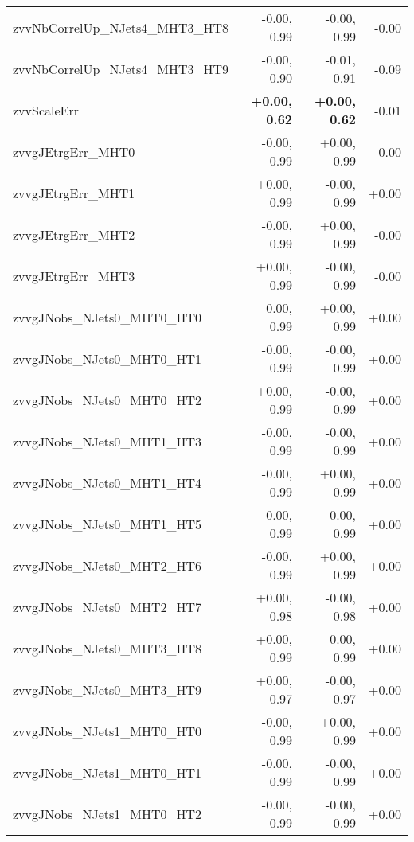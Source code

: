 \begin{tabular}{|l|r|r|r|}
zvvNbCorrelUp\_NJets4\_MHT3\_HT8         &      -0.00, 0.99 &     -0.00, 0.99 &  -0.00 \\
zvvNbCorrelUp\_NJets4\_MHT3\_HT9         &      -0.00, 0.90 &     -0.01, 0.91 &  -0.09 \\
zvvScaleErr                              &  \textbf{ +0.00, 0.62} & \textbf{ +0.00, 0.62} &  -0.01 \\
zvvgJEtrgErr\_MHT0                       &      -0.00, 0.99 &     +0.00, 0.99 &  -0.00 \\
zvvgJEtrgErr\_MHT1                       &      +0.00, 0.99 &     -0.00, 0.99 &  +0.00 \\
zvvgJEtrgErr\_MHT2                       &      -0.00, 0.99 &     +0.00, 0.99 &  -0.00 \\
zvvgJEtrgErr\_MHT3                       &      +0.00, 0.99 &     -0.00, 0.99 &  -0.00 \\
zvvgJNobs\_NJets0\_MHT0\_HT0             &      -0.00, 0.99 &     +0.00, 0.99 &  +0.00 \\
zvvgJNobs\_NJets0\_MHT0\_HT1             &      -0.00, 0.99 &     -0.00, 0.99 &  +0.00 \\
zvvgJNobs\_NJets0\_MHT0\_HT2             &      +0.00, 0.99 &     -0.00, 0.99 &  +0.00 \\
zvvgJNobs\_NJets0\_MHT1\_HT3             &      -0.00, 0.99 &     -0.00, 0.99 &  +0.00 \\
zvvgJNobs\_NJets0\_MHT1\_HT4             &      -0.00, 0.99 &     +0.00, 0.99 &  +0.00 \\
zvvgJNobs\_NJets0\_MHT1\_HT5             &      -0.00, 0.99 &     -0.00, 0.99 &  +0.00 \\
zvvgJNobs\_NJets0\_MHT2\_HT6             &      -0.00, 0.99 &     +0.00, 0.99 &  +0.00 \\
zvvgJNobs\_NJets0\_MHT2\_HT7             &      +0.00, 0.98 &     -0.00, 0.98 &  +0.00 \\
zvvgJNobs\_NJets0\_MHT3\_HT8             &      +0.00, 0.99 &     -0.00, 0.99 &  +0.00 \\
zvvgJNobs\_NJets0\_MHT3\_HT9             &      +0.00, 0.97 &     -0.00, 0.97 &  +0.00 \\
zvvgJNobs\_NJets1\_MHT0\_HT0             &      -0.00, 0.99 &     +0.00, 0.99 &  +0.00 \\
zvvgJNobs\_NJets1\_MHT0\_HT1             &      -0.00, 0.99 &     -0.00, 0.99 &  +0.00 \\
zvvgJNobs\_NJets1\_MHT0\_HT2             &      -0.00, 0.99 &     -0.00, 0.99 &  +0.00 \\

\end{tabular}
